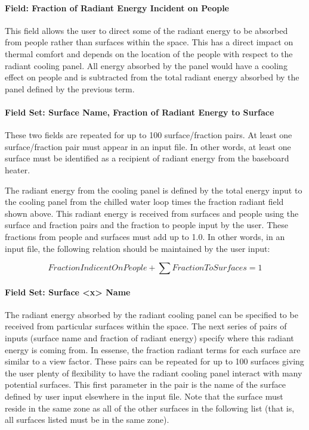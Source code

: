 \paragraph{Field: Fraction of Radiant Energy Incident on People}\label{field-fraction-of-radiant-energy-incident-on-people-2-1}

This field allows the user to direct some of the radiant energy to be absorbed from people rather than surfaces within the space.  This has a direct impact on thermal comfort and depends on the location of the people with respect to the radiant cooling panel.  All energy absorbed by the panel would have a cooling effect on people and is subtracted from the total radiant energy absorbed by the panel defined by the previous term.

\paragraph{Field Set: Surface Name, Fraction of Radiant Energy to Surface}\label{field-set-surface-name-fraction-of-radiant-energy-to-surface-2-1}

These two fields are repeated for up to 100 surface/fraction pairs. At least one surface/fraction pair must appear in an input file. In other words, at least one surface must be identified as a recipient of radiant energy from the baseboard heater.

The radiant energy from the cooling panel is defined by the total energy input to the cooling panel from the chilled water loop times the fraction radiant field shown above. This radiant energy is received from surfaces and people using the surface and fraction pairs and the fraction to people input by the user. These fractions from people and surfaces must add up to 1.0. In other words, in an input file, the following relation should be maintained by the user input:

\begin{equation}
FractionIndicentOnPeople + \sum {FractionToSurfaces} = 1
\end{equation}

\paragraph{Field Set: Surface \textless{}x\textgreater{} Name}\label{field-set-surface-x-name-1}

The radiant energy absorbed by the radiant cooling panel can be specified to be received from particular surfaces within the space.  The next series of pairs of inputs (surface name and fraction of radiant energy) specify where this radiant energy is coming from.  In essense, the fraction radiant terms for each surface are similar to a view factor.  These pairs can be repeated for up to 100 surfaces giving the user plenty of flexibility to have the radiant cooling panel interact with many potential surfaces.  This first parameter in the pair is the name of the surface defined by user input elsewhere in the input file.  Note that the surface must reside in the same zone as all of the other surfaces in the following list (that is, all surfaces listed must be in the same zone).


